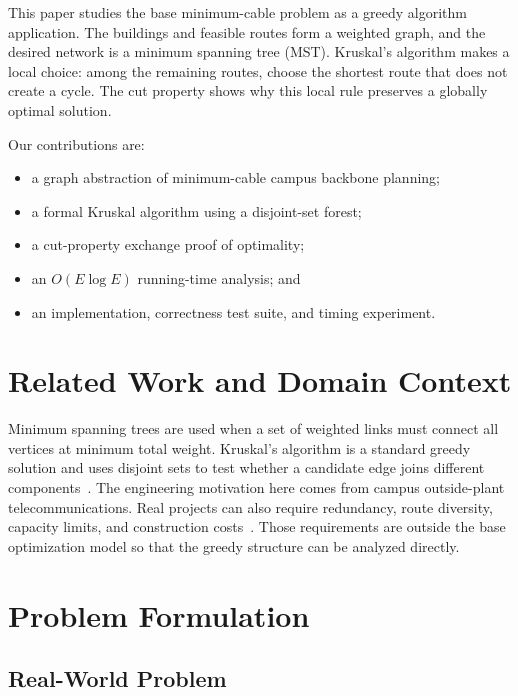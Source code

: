\documentclass[conference]{IEEEtran}
\begin{document}
This paper studies the base minimum-cable problem as a greedy algorithm
application. The buildings and feasible routes form a weighted graph, and the
desired network is a minimum spanning tree (MST). Kruskal's algorithm makes a
local choice: among the remaining routes, choose the shortest route that does
not create a cycle. The cut property shows why this local rule preserves a
globally optimal solution.

Our contributions are:
\begin{itemize}
  \item a graph abstraction of minimum-cable campus backbone planning;
  \item a formal Kruskal algorithm using a disjoint-set forest;
  \item a cut-property exchange proof of optimality;
  \item an $O(E\log E)$ running-time analysis; and
  \item an implementation, correctness test suite, and timing experiment.
\end{itemize}

\section{Related Work and Domain Context}

Minimum spanning trees are used when a set of weighted links must connect all
vertices at minimum total weight. Kruskal's algorithm is a standard greedy
solution and uses disjoint sets to test whether a candidate edge joins
different components~\cite{cormen2009introduction}. The engineering motivation
here comes from campus outside-plant telecommunications. Real projects can
also require redundancy, route diversity, capacity limits, and construction
costs~\cite{yale2025infrastructure}. Those requirements are outside the base
optimization model so that the greedy structure can be analyzed directly.

\section{Problem Formulation}

\subsection{Real-World Problem}
\end{document}
